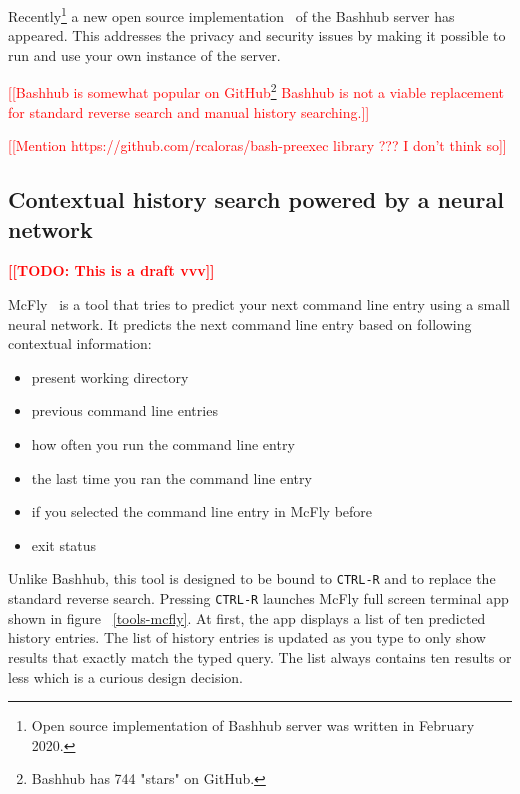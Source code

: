 \documentclass[thesis=M,english]{FITthesis}[2012/10/20]
\newcommand{\todotext}[1]{\textcolor{red}{\textbf{[[#1]]}}}
\newcommand{\redtext}[1]{\textcolor{red}{[[#1]]}}
\let\myCite\cite
\renewcommand\cite{\unskip~\myCite}
\let\myRef\ref
\renewcommand\ref{\unskip~\myRef}
\begin{document}
Recently\footnote{Open source implementation of Bashhub server was written in February 2020.} a new open source implementation\cite{toolsbashhubserver} of the Bashhub server has appeared. This addresses the privacy and security issues by making it possible to run and use your own instance of the server.

\redtext{Bashhub is somewhat popular on GitHub\footnote{Bashhub has 744 "stars" on GitHub.}
Bashhub is not a viable replacement for standard reverse search and manual history searching.}



\redtext{Mention https://github.com/rcaloras/bash-preexec library ??? I don't think so}

\subsection{Contextual history search powered by a neural network}

\todotext{TODO: This is a draft vvv}

McFly\cite{toolsmcfly} is a tool that tries to predict your next command line entry using a small neural network. It predicts the next command line entry based on following contextual information:
\begin{itemize}
    \item present working directory
    \item previous command line entries
    \item how often you run the command line entry
    \item the last time you ran the command line entry
    \item if you selected the command line entry in McFly before
    \item exit status
\end{itemize}

Unlike Bashhub, this tool is designed to be bound to \verb|CTRL-R| and to replace the standard reverse search. Pressing \verb|CTRL-R| launches McFly full screen terminal app shown in figure \ref{tools-mcfly}. At first, the app displays a list of ten predicted history entries. The list of history entries is updated as you type to only show results that exactly match the typed query. The list always contains ten results or less which is a curious design decision. 
\end{document}
